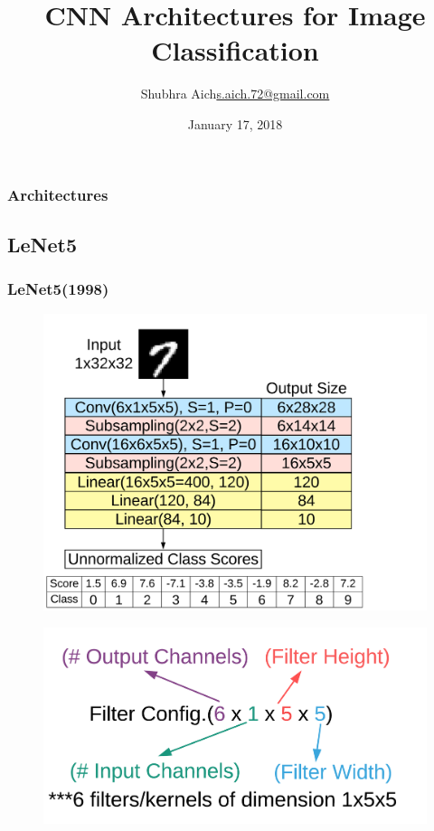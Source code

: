 \documentclass[9pt]{beamer}
\title[Short Paper Title]{CNN Architectures for Image Classification}
\subtitle{}
\institute{}
\author{\texorpdfstring{Shubhra Aich\newline\url{s.aich.72@gmail.com}}{Shubhra Aich}}
\date{January 17, 2018}
\begin{document}
\nocite{*}

\begin{frame}
  \titlepage
\end{frame}

\begin{frame}
  \frametitle{Architectures}
  \tableofcontents
\end{frame}


\subsection{LeNet5}
\begin{frame}
	\frametitle{LeNet5(1998)}
	\begin{minipage}[t]{0.45\textwidth}	
		\begin{figure}[t]
			\includegraphics[scale=0.06]{./figures/edit/lenet5.png}
		\end{figure}
	\end{minipage}	\hspace{1.0cm}
	\begin{minipage}[t]{0.40\textwidth}
		\begin{figure}
	\includegraphics[scale=0.07]{./figures/edit/filter_config.png} 				
	\end{figure} \\
	

\end{minipage}
\end{frame}
\end{document}
